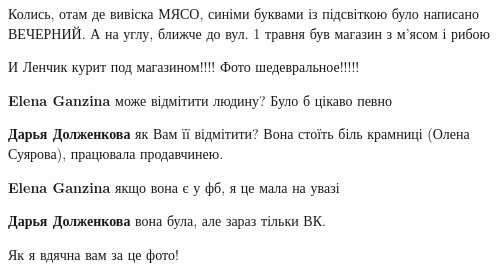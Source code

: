 
Колись, отам де вивіска МЯСО, синіми буквами із підсвіткою було написано
ВЕЧЕРНИЙ. А на углу, ближче до вул. 1 травня був магазин з м'ясом і рибою


И Ленчик курит под магазином!!!! Фото шедевральное!!!!!

\begin{itemize} %
\textbf{Elena Ganzina} може відмітити людину? Було б цікаво певно

\textbf{Дарья Долженкова} як Вам її відмітити? Вона стоїть біль крамниці (Олена Суярова), працювала продавчинею.

\textbf{Elena Ganzina} якщо вона є у фб, я це мала на увазі

\textbf{Дарья Долженкова} вона була, але зараз тільки ВК.
\end{itemize} %


Як я вдячна вам за це фото!
